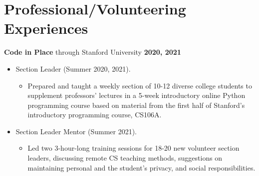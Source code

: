\documentclass[12pt, letterpaper]{article}
\begin{document}
\section*{\large{Professional/Volunteering Experiences}}\vspace{-0.5em}\hline\vspace{0.5em}
\noindent
\normalsize{}\textbf{Code in Place} through Stanford University \hfill \small\textbf{2020, 2021} \vspace{-0.6em}
\begin{itemize}
\item \normalsize{Section Leader (Summer 2020, 2021)}.  \vspace{-0.6em}
    \begin{itemize}
        \item Prepared and taught a weekly section of 10-12 diverse college students to supplement professors’ lectures in a 5-week introductory online Python programming course based on material from the first half of Stanford’s introductory programming course, CS106A.\vspace{-0.6em}
    \end{itemize}
\item \normalsize{Section Leader Mentor (Summer 2021)}.  \vspace{-0.6em}
    \begin{itemize}
        \item Led two 3-hour-long training sessions for 18-20 new volunteer section leaders, discussing remote CS teaching methods, suggestions on maintaining personal and the student’s privacy, and social responsibilities.\vspace{-0.6em}
    \end{itemize} \vspace{0em}
\end{itemize}
\end{document}
